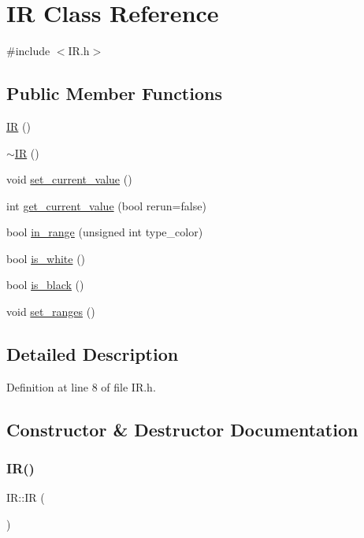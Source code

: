 \hypertarget{class_i_r}{}\section{IR Class Reference}
\label{class_i_r}


{\ttfamily \#include $<$I\+R.\+h$>$}

\subsection*{Public Member Functions}
\begin{DoxyCompactItemize}
\item 
\mbox{\hyperlink{class_i_r_aa4098d98350ff7f6fa1d58ef97283946}{IR}} ()
\item 
\mbox{\hyperlink{class_i_r_acc2e758f018c7b069315a826e9ca3043}{$\sim$\+IR}} ()
\item 
void \mbox{\hyperlink{class_i_r_a2d60cbf66f48bad8167e2c4231ed3f95}{set\+\_\+current\+\_\+value}} ()
\item 
int \mbox{\hyperlink{class_i_r_a5b71d10f57e8dbb76cdf01e043cfdda1}{get\+\_\+current\+\_\+value}} (bool rerun=false)
\item 
bool \mbox{\hyperlink{class_i_r_a388cfd7a959fa4a24d8e2bad1e9d95d5}{in\+\_\+range}} (unsigned int type\+\_\+color)
\item 
bool \mbox{\hyperlink{class_i_r_ae05cf1ad5888262586007946f21ac14e}{is\+\_\+white}} ()
\item 
bool \mbox{\hyperlink{class_i_r_a2f62691ee90ca2a9035c088029dab4bb}{is\+\_\+black}} ()
\item 
void \mbox{\hyperlink{class_i_r_a8bcc5c0570384da5a39e395b91bc2d2b}{set\+\_\+ranges}} ()
\end{DoxyCompactItemize}


\subsection{Detailed Description}


Definition at line 8 of file I\+R.\+h.



\subsection{Constructor \& Destructor Documentation}
\mbox{\label{class_i_r_aa4098d98350ff7f6fa1d58ef97283946}} 
\subsubsection{\texorpdfstring{I\+R()}{IR()}}
{\footnotesize\ttfamily I\+R\+::\+IR (\begin{DoxyParamCaption}{ }\end{DoxyParamCaption})}




